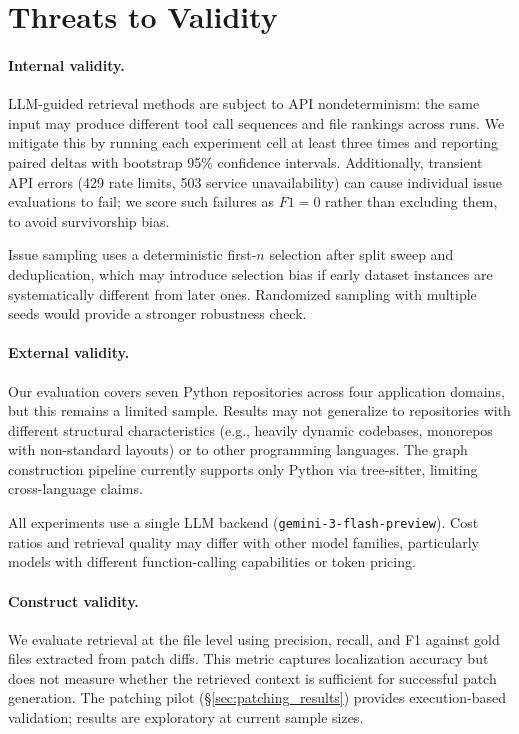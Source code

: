 \section{Threats to Validity}
\label{sec:threats}

\paragraph{Internal validity.}
LLM-guided retrieval methods are subject to API nondeterminism: the same input may produce different tool call sequences and file rankings across runs. We mitigate this by running each experiment cell at least three times and reporting paired deltas with bootstrap 95\% confidence intervals. Additionally, transient API errors (429 rate limits, 503 service unavailability) can cause individual issue evaluations to fail; we score such failures as $F1 = 0$ rather than excluding them, to avoid survivorship bias.

Issue sampling uses a deterministic first-$n$ selection after split sweep and deduplication, which may introduce selection bias if early dataset instances are systematically different from later ones. Randomized sampling with multiple seeds would provide a stronger robustness check.

\paragraph{External validity.}
Our evaluation covers seven Python repositories across four application domains, but this remains a limited sample. Results may not generalize to repositories with different structural characteristics (e.g., heavily dynamic codebases, monorepos with non-standard layouts) or to other programming languages. The graph construction pipeline currently supports only Python via tree-sitter, limiting cross-language claims.

All experiments use a single LLM backend (\texttt{gemini-3-flash-preview}). Cost ratios and retrieval quality may differ with other model families, particularly models with different function-calling capabilities or token pricing.

\paragraph{Construct validity.}
We evaluate retrieval at the file level using precision, recall, and F1 against gold files extracted from patch diffs. This metric captures localization accuracy but does not measure whether the retrieved context is sufficient for successful patch generation. The patching pilot (\S\ref{sec:patching_results}) provides execution-based validation; results are exploratory at current sample sizes.

